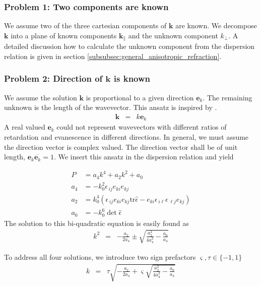 \documentclass[12pt,a4paper,twoside,openright,BCOR10mm,headsepline,titlepage,abstracton,chapterprefix,final]{scrreprt}
\newcommand\Vector[1]{{\mathbf{#1}}}
\newcommand\wavenumber{k}
\newcommand\Wavevector{\Vector{\wavenumber}}
\newcommand\Tensor[1]{\hat{#1}}
\newcommand\scalarrelativepermittivity{\epsilon}
\newcommand\relativepermittivity{\Tensor{\scalarrelativepermittivity}}
\newcommand\tr{\text{tr}}
\begin{document}
\subsubsection{Problem 1: Two components are known}

We assume two of the three cartesian components of $\Wavevector$ are known.
We decompose $\Wavevector$ into a plane of known components $\Wavevector_\parallel$ and the unknown component $\wavenumber_\perp$. 
A detailed discussion how to calculate the unknown component from the dispersion relation
is given in section \ref{subsubsec:general_anisotropic_refraction}.

\subsubsection{Problem 2: Direction of $\Wavevector$ is known}
We assume the solution $\Wavevector$ is proportional to a given direction $\Vector{e}_\wavenumber$.
The remaining unknown is the length of the wavevector. This ansatz is inspired by \cite{Doering:1957, wiki:Kristalloptik}.
\begin{eqnarray}
 \Wavevector &=& \wavenumber \Vector{e}_\wavenumber
\end{eqnarray}
A real valued $\Vector{e}_\wavenumber$ could not represent wavevectors with different ratios of retardation and evanescence in different directions.
In general, we must assume the direction vector is complex valued.
The direction vector shall be of unit length, $\Vector{e}_\wavenumber \overline{\Vector{e}_\wavenumber} = 1$.
We insert this ansatz in the dispersion relation and yield

\begin{align}
 P &= a_4 \wavenumber^4 + a_2 \wavenumber^2 + a_0
 \\
 a_4 &= - k_0^2 \scalarrelativepermittivity_{\,ij} e_{ki} e_{kj}
 \\
 a_2 &=   k_0^4 ( \scalarrelativepermittivity_{\,ij} e_{ki} e_{kj} \tr\relativepermittivity - e_{ki} \scalarrelativepermittivity_{\,i\ell} \scalarrelativepermittivity_{\,\ell j} e_{kj})
 \\
 a_0 &= - k_0^6 \det \relativepermittivity
\end{align}
The solution to this bi-quadratic equation is easily found as
\begin{eqnarray}
 \wavenumber^2 &=& - \frac{a_2}{2 a_4} \pm \sqrt{\frac{a_2^2}{4 a_4^2} - \frac{a_0}{a_4}} 
\end{eqnarray}

To address all four solutions, we introduce two sign prefactors $\varsigma, \tau \in \{ -1,1\}$
\begin{eqnarray}
 \wavenumber &=& \tau \sqrt{ - \frac{a_2}{2 a_4} + \varsigma \sqrt{\frac{a_2^2}{4 a_4^2} - \frac{a_0}{a_4}} } \label{eq:dispersion_for_known_direction}
\end{eqnarray}
\end{document}
